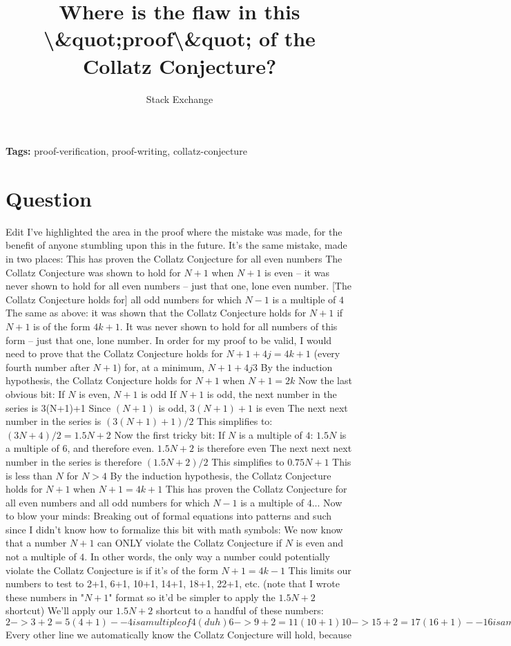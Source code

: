 \documentclass{article}
\title{Where is the flaw in this \textbackslash{}&quot;proof\textbackslash{}&quot; of the Collatz Conjecture?}
\author{Stack Exchange}
\date{}
\begin{document}
\maketitle

\noindent\textbf{Tags:} proof-verification, proof-writing, collatz-conjecture

\section*{Question}
Edit I've highlighted the area in the proof where the mistake was made, for the benefit of anyone stumbling upon this in the future. It's the same mistake, made in two places: This has proven the Collatz Conjecture for all even numbers The Collatz Conjecture was shown to hold for $N+1$ when $N+1$ is even -- it was never shown to hold for all even numbers -- just that one, lone even number. [The Collatz Conjecture holds for] all odd numbers for which $N-1$ is a multiple of $4$ The same as above: it was shown that the Collatz Conjecture holds for $N+1$ if $N+1$ is of the form $4k+1$. It was never shown to hold for all numbers of this form -- just that one, lone number. In order for my proof to be valid, I would need to prove that the Collatz Conjecture holds for $N+1+4j = 4k+1$ (every fourth number after $N+1$) for, at a minimum, $N+1+4j  3$ By the induction hypothesis, the Collatz Conjecture holds for $N+1$ when $N+1 = 2k$ Now the last obvious bit: If $N$ is even, $N+1$ is odd If $N+1$ is odd, the next number in the series is 3(N+1)+1 Since $(N+1)$ is odd, $3(N+1)+1$ is even The next next number in the series is $(3(N+1)+1)/2$ This simplifies to: $(3N + 4)/2 = 1.5N + 2$ Now the first tricky bit: If $N$ is a multiple of $4$: $1.5N$ is a multiple of $6$, and therefore even. $1.5N + 2$ is therefore even The next next next number in the series is therefore $(1.5N+2)/2$ This simplifies to $0.75N + 1$ This is less than $N$ for $N > 4$ By the induction hypothesis, the Collatz Conjecture holds for $N+1$ when $N+1 = 4k + 1$ This has proven the Collatz Conjecture for all even numbers and all odd numbers for which $N-1$ is a multiple of $4$... Now to blow your minds: Breaking out of formal equations into patterns and such since I didn't know how to formalize this bit with math symbols: We now know that a number $N+1$ can ONLY violate the Collatz Conjecture if $N$ is even and not a multiple of $4$. In other words, the only way a number could potentially violate the Collatz Conjecture is if it's of the form $N+1 = 4k - 1$ This limits our numbers to test to 2+1, 6+1, 10+1, 14+1, 18+1, 22+1, etc. (note that I wrote these numbers in "$N+1$" format so it'd be simpler to apply the $1.5N+2$ shortcut) We'll apply our $1.5N + 2$ shortcut to a handful of these numbers: $2 -> 3+2 = 5 (4 +1) -- 4 is a multiple of 4 (duh) 6 -> 9+2 = 11 (10+1) 10 -> 15+2 = 17 (16+1) -- 16 is a multiple of 4 14 -> 21+2 = 23 (22+1) 18 -> 27+2 = 29 (28+1) -- 28 is a multiple of 4 22 -> 33+2 = 35 (34+1) 26 -> 39+2 = 41 (40+1) -- 40 is a multiple of 4 30 -> 45+2 = 47 (46+1) 34 -> 51+2 = 53 (52+1) -- 52 is a multiple of 4 38 -> 57+2 = 59 (58+1) 42 -> 63+2 = 65 (64+1) -- 64 is a multiple of 4 46 -> 69+2 = 71 (70+1) $ Every other line we automatically know the Collatz Conjecture will hold, because 
\end{document}
